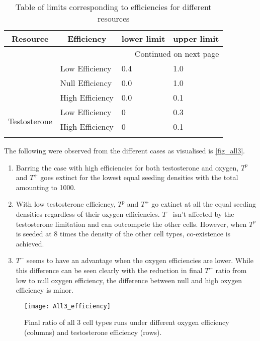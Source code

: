 \begin{longtable}[c]{|l|l|l|l|}
  \hline  \multicolumn{1}{|c|}{\textbf{Resource}} & \multicolumn{1}{c|}{\textbf{Efficiency}} & \multicolumn{1}{c|}{\textbf{lower limit}} & \multicolumn{1}{c|}{\textbf{upper limit}}  \\ \hline
  \endhead

  \hline \multicolumn{4}{|r|}{{Continued on next page}} \\ \hline
  \endfoot

  \endlastfoot

  \multirow{3}{*}{Oxygen} & Low Efficiency & 0.4 & 1.0 \\ \cline{2-4}
  & Null Efficiency & 0.0 & 1.0 \\ \cline{2-4}
  & High Efficiency & 0.0 & 0.1 \\ \hline
  \multirow{3}{*}{Testosterone} & Low Efficiency & 0 & 0.3 \\ \cline{2-4}
  & High Efficiency & 0 & 0.1 \\ \hline

  \caption{Table of limits corresponding to efficiencies for different resources}
  \label{tab_efficiencies}
\end{longtable}

The following were observed from the different cases as visualised is \autoref{fig_all3}.
\begin{enumerate}
  \item Barring the case with high efficiencies for both testosterone and oxygen, $T^p$ and $T^+$ goes extinct for the lowest equal seeding densities with the total amounting to 1000.
  \item With low testosterone efficiency, $T^p$ and $T^+$ go extinct at all the equal seeding densities regardless of their oxygen efficiencies. $T^-$ isn't affected by the testosterone limitation and can outcompete the other cells. However, when $T^p$ is seeded at 8 times the density of the other cell types, co-existence is achieved.
  \item $T^-$ seems to have an advantage when the oxygen efficiencies are lower. While this difference can be seen clearly with the reduction in final $T^-$ ratio from low to null oxygen efficiency, the difference between null and high oxygen efficiency is minor.
\end{enumerate}

\begin{figure}[h!]
\centering
\texttt{[image: All3\_efficiency]}
\caption[Final ratio of all 3 cell types runs under different efficiencies]{Final ratio of all 3 cell types runs under different oxygen efficiency (columns) and testosterone efficiency (rows).}
\label{fig_all3}
\end{figure}
